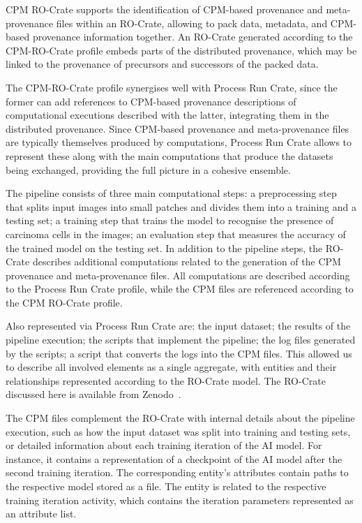 CPM RO-Crate supports the identification of CPM-based provenance and meta-provenance files within an RO-Crate, allowing to pack data, metadata, and CPM-based provenance information together. 
An RO-Crate generated according to the CPM-RO-Crate profile embeds parts of the distributed provenance, which may be linked to the provenance of precursors and successors of the packed data. 

The CPM-RO-Crate profile synergises well with Process Run Crate, since the former can add references to CPM-based provenance descriptions of computational executions described with the latter, integrating them in the distributed provenance. Since CPM-based provenance and meta-provenance files are typically themselves produced by computations, Process Run Crate allows to represent these along with the main computations that produce the datasets being exchanged, providing the full picture in a cohesive ensemble.


The pipeline consists of three main computational steps: a preprocessing step that splits input images into small patches and divides them into a training and a testing set; a training step that trains the model to recognise the presence of carcinoma cells in the images; an evaluation step that measures the accuracy of the trained model on the testing set.
In addition to the pipeline steps, the RO-Crate describes additional computations related to the generation of the CPM provenance and meta-provenance files.
All computations are described according to the Process Run Crate profile, while the CPM files are referenced according to the CPM RO-Crate profile. 

Also represented via Process Run Crate are: the input dataset; the results of the pipeline execution; the scripts that implement the pipeline; the log files generated by the scripts; a script that converts the logs into the CPM files.
This allowed us to describe all involved elements as a single aggregate, with entities and their relationships represented according to the RO-Crate model.
The RO-Crate discussed here is available from Zenodo~\cite{Wittner 2023c}.

The CPM files complement the RO-Crate with internal details about the pipeline execution, such as how the input dataset was split into training and testing sets, or detailed information about each training iteration of the AI model.
For instance, it contains a representation of a checkpoint of the AI model after the second training iteration.
The corresponding entity's attributes contain paths to the respective model stored as a file.
The entity is related to the respective training iteration activity, which contains the iteration parameters represented as an attribute list.

